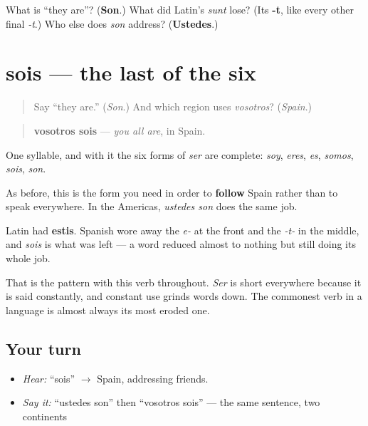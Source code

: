 \begin{tcolorbox}[breakable,colback=teal!4,colframe=teal!35!black,title={Before you move on}]
What is \textquotedblleft{}they are\textquotedblright{}? (\textbf{Son}.) What did Latin's \emph{sunt} lose? (Its \textbf{-t}, like every other final \emph{-t}.) Who else does \emph{son} address? (\textbf{Ustedes}.)
\end{tcolorbox}
\section[sois]{sois — the last of the six}

\label{lesson:ES-C09-sois}



\begin{quote}
Say \textquotedblleft{}they are.\textquotedblright{} (\emph{Son}.) And which region uses \emph{vosotros}? (\emph{Spain}.)
\end{quote}

\begin{grammarlens}[title={Grammar Lens: one syllable, and the paradigm closes}]
\begin{quote}
\textbf{vosotros sois} — \emph{you all are}, in Spain.
\end{quote}

One syllable, and with it the six forms of \emph{ser} are complete: \emph{soy}, \emph{eres}, \emph{es}, \emph{somos}, \emph{sois}, \emph{son}.

As before, this is the form you need in order to \textbf{follow} Spain rather than to speak everywhere. In the Americas, \emph{ustedes son} does the same job.
\end{grammarlens}

\begin{cousinweb}
Latin had \textbf{estis}. Spanish wore away the \emph{e-} at the front and the \emph{-t-} in the middle, and \emph{sois} is what was left — a word reduced almost to nothing but still doing its whole job.

That is the pattern with this verb throughout. \emph{Ser} is short everywhere because it is said constantly, and constant use grinds words down. The commonest verb in a language is almost always its most eroded one.
\end{cousinweb}

\subsection*{Your turn}
\begin{itemize}
\raggedright
  \item \emph{Hear:} \textquotedblleft{}sois\textquotedblright{} $\to$ Spain, addressing friends.
  \item \emph{Say it:} \textquotedblleft{}ustedes son\textquotedblright{} then \textquotedblleft{}vosotros sois\textquotedblright{} — the same sentence, two continents
\end{itemize}

